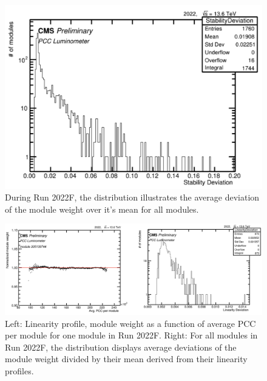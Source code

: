 
\begin{figure}[!htp]
  \centering
\includegraphics[width=1\textwidth]{ashish_thesis/stability_deviation_2022_1.png}
\caption[Module Weight Standard Deviation]{%
  During Run 2022F, the distribution illustrates the average deviation of the module weight over it's mean for all modules.
}
\label{fig:stab_deviation_2022}
\end{figure}

\begin{figure}[!htp]
  \centering
\includegraphics[width=1\textwidth]{ashish_thesis/linearity_deviation_2022_1.png}
\caption[Module Linearity & Linearity Deviation Distribution]{%
 Left: Linearity profile, module weight as a function of average PCC per module for one module in Run 2022F. Right: For all modules in Run 2022F, the distribution displays average deviations of the module weight divided by their mean derived from their linearity profiles.
}
\label{fig:lin_deviation_2022}
\end{figure}

